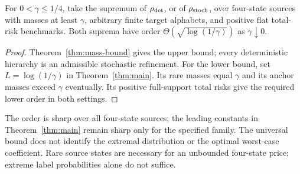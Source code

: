 \begin{corollary}
\label{cor:sharp-mass-order}
For $0<\gamma\le1/4$, take the supremum of $\rho_{\rm det}$, or
of $\rho_{\rm stoch}$, over four-state sources with masses at least
$\gamma$, arbitrary finite target alphabets, and positive flat total-risk
benchmarks. Both suprema have order
$\Theta(\sqrt{\log(1/\gamma)})$ as $\gamma\downarrow0$.
\end{corollary}
\begin{proof}
Theorem~\ref{thm:mass-bound} gives the upper bound; every deterministic
hierarchy is an admissible stochastic refinement. For the lower bound,
set $L=\log(1/\gamma)$ in Theorem~\ref{thm:main}. Its rare masses equal
$\gamma$ and its anchor masses exceed $\gamma$ eventually. Its positive
full-support total risks give the required lower order in both settings.
\end{proof}

The order is sharp over all four-state sources; the leading constants
in Theorem~\ref{thm:main} remain sharp only for the specified family.
The universal bound does not identify the extremal distribution or the
optimal worst-case coefficient. Rare source states are necessary for an
unbounded four-state price; extreme label probabilities alone do not suffice.
